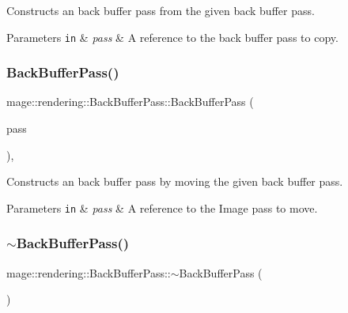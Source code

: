 Constructs an back buffer pass from the given back buffer pass.


\begin{DoxyParams}[1]{Parameters}
\mbox{\tt in}  & {\em pass} & A reference to the back buffer pass to copy. \\
\hline
\end{DoxyParams}
\hypertarget{classmage_1_1rendering_1_1_back_buffer_pass_ac8dfbaabb766f4bfd61cfea8d01dd7dc}{}\label{classmage_1_1rendering_1_1_back_buffer_pass_ac8dfbaabb766f4bfd61cfea8d01dd7dc} 
\subsubsection{\texorpdfstring{Back\+Buffer\+Pass()}{BackBufferPass()}\hspace{0.1cm}{\footnotesize\ttfamily [3/3]}}
{\footnotesize\ttfamily mage\+::rendering\+::\+Back\+Buffer\+Pass\+::\+Back\+Buffer\+Pass (\begin{DoxyParamCaption}\item[{\hyperlink{classmage_1_1rendering_1_1_back_buffer_pass}{Back\+Buffer\+Pass} \&\&}]{pass }\end{DoxyParamCaption})\hspace{0.3cm}{\ttfamily [default]}, {\ttfamily [noexcept]}}

Constructs an back buffer pass by moving the given back buffer pass.


\begin{DoxyParams}[1]{Parameters}
\mbox{\tt in}  & {\em pass} & A reference to the Image pass to move. \\
\hline
\end{DoxyParams}
\hypertarget{classmage_1_1rendering_1_1_back_buffer_pass_a697a5e094cdcdf9f42dd2efdda957b57}{}\label{classmage_1_1rendering_1_1_back_buffer_pass_a697a5e094cdcdf9f42dd2efdda957b57} 
\subsubsection{\texorpdfstring{$\sim$\+Back\+Buffer\+Pass()}{~BackBufferPass()}}
{\footnotesize\ttfamily mage\+::rendering\+::\+Back\+Buffer\+Pass\+::$\sim$\+Back\+Buffer\+Pass (\begin{DoxyParamCaption}{ }\end{DoxyParamCaption})\hspace{0.3cm}{\ttfamily [default]}}

